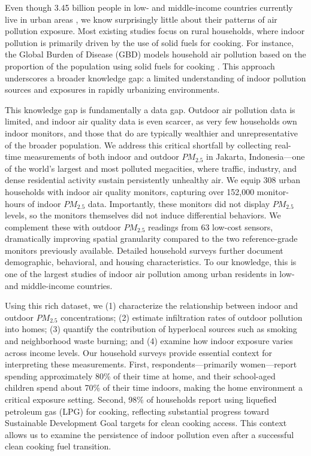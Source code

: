 \documentclass[reqno,12pt,notitlepage]{article}
\begin{document}
Even though 3.45 billion people in low- and middle-income countries currently live in urban areas \citep{noauthor_urban_2023}, we know surprisingly little about their patterns of air pollution exposure. Most existing studies focus on rural households, where indoor pollution is primarily driven by the use of solid fuels for cooking. For instance, the Global Burden of Disease (GBD) models household air pollution based on the proportion of the population using solid fuels for cooking \citep{bennitt_global_2025}. This approach underscores a broader knowledge gap: a limited understanding of indoor pollution sources and exposures in rapidly urbanizing environments. 

This knowledge gap is fundamentally a data gap. Outdoor air pollution data is limited, and indoor air quality data is even scarcer, as very few households own indoor monitors, and those that do are typically wealthier and unrepresentative of the broader population. We address this critical shortfall by collecting real-time measurements of both indoor and outdoor $PM_{2.5}$ in Jakarta, Indonesia—one of the world’s largest and most polluted megacities, where traffic, industry, and dense residential activity sustain persistently unhealthy air. We equip 308 urban households with indoor air quality monitors, capturing over 152,000 monitor-hours of indoor $PM_{2.5}$ data. Importantly, these monitors did not display $PM_{2.5}$ levels, so the monitors themselves did not induce differential behaviors. We complement these with outdoor $PM_{2.5}$ readings from 63 low-cost sensors, dramatically improving spatial granularity compared to the two reference-grade monitors previously available. Detailed household surveys further document demographic, behavioral, and housing characteristics. To our knowledge, this is one of the largest studies of indoor air pollution among urban residents in low- and middle-income countries. 

Using this rich dataset, we (1) characterize the relationship between indoor and outdoor $PM_{2.5}$ concentrations; (2) estimate infiltration rates of outdoor pollution into homes; (3) quantify the contribution of hyperlocal sources such as smoking and neighborhood waste burning; and (4) examine how indoor exposure varies across income levels. Our household surveys provide essential context for interpreting these measurements. First, respondents—primarily women—report spending approximately 80\% of their time at home, and their school-aged children spend about 70\% of their time indoors, making the home environment a critical exposure setting. Second, 98\% of households report using liquefied petroleum gas (LPG)  for cooking, reflecting substantial progress toward Sustainable Development Goal targets for clean cooking access. This context allows us to examine the persistence of indoor pollution even after a successful clean cooking fuel transition.
\end{document}
